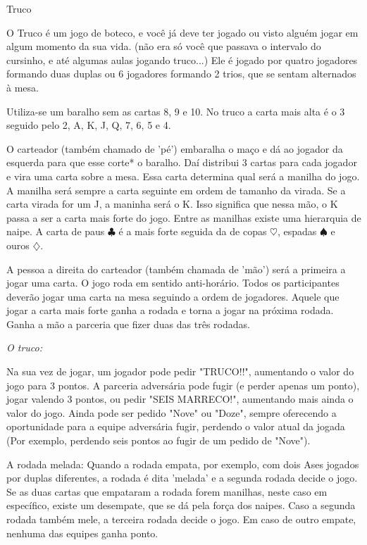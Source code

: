 \begin{subsecao}{Truco}

O Truco é um jogo de boteco, e você já deve ter jogado ou visto alguém jogar em
algum momento da sua vida. (não era só você que passava o intervalo do
cursinho, e até algumas aulas jogando truco...) Ele é jogado por quatro
jogadores formando duas duplas ou 6 jogadores formando 2 trios, que se sentam
alternados à mesa.

Utiliza-se um baralho sem as cartas 8, 9 e 10. No truco a carta mais alta é o 3
seguido pelo 2, A, K, J, Q, 7, 6, 5 e 4. 

O carteador (também chamado de 'pé') embaralha o maço e dá ao jogador da
esquerda para que esse corte* o baralho. Daí distribui 3 cartas para cada
jogador e vira uma carta sobre a mesa. Essa carta determina qual será a manilha
do jogo. A manilha será sempre a carta seguinte em ordem de tamanho da virada.
Se a carta virada for um J, a maninha será o K. Isso significa que nessa mão, o
K passa a ser a carta mais forte do jogo. Entre as manilhas existe uma
hierarquia de naipe. A carta de paus $\clubsuit$  é a mais forte seguida da de copas $\heartsuit$,
espadas $\spadesuit$ e ouros $\diamondsuit$.

A pessoa a direita do carteador (também chamada de 'mão') será a primeira a
jogar uma carta. O jogo roda em sentido anti-horário. Todos os participantes
deverão jogar uma carta na mesa seguindo a ordem de jogadores. Aquele que jogar
a carta mais forte ganha a rodada e torna a jogar na próxima rodada. Ganha a
mão a parceria que fizer duas das três rodadas.

\textit{O truco:}

Na sua vez de jogar, um jogador pode pedir "TRUCO!!", aumentando o valor do
jogo para 3 pontos. A parceria adversária pode fugir (e perder apenas um
ponto), jogar valendo 3 pontos, ou pedir "SEIS MARRECO!", aumentando mais ainda
o valor do jogo. Ainda pode ser pedido "Nove" ou "Doze", sempre oferecendo a
oportunidade para a equipe adversária fugir, perdendo o valor atual da
jogada (Por exemplo, perdendo seis pontos ao fugir de um pedido de "Nove"). 

A rodada melada: Quando a rodada empata, por exemplo, com dois Ases jogados por
duplas diferentes, a rodada é dita 'melada' e a segunda rodada decide o jogo.
Se as duas cartas que empataram a rodada forem manilhas, neste caso em
específico, existe um desempate, que se dá pela força dos naipes.  Caso a
segunda rodada também mele, a terceira rodada decide o jogo. Em caso de outro
empate, nenhuma das equipes ganha ponto. 


\end{subsecao}
